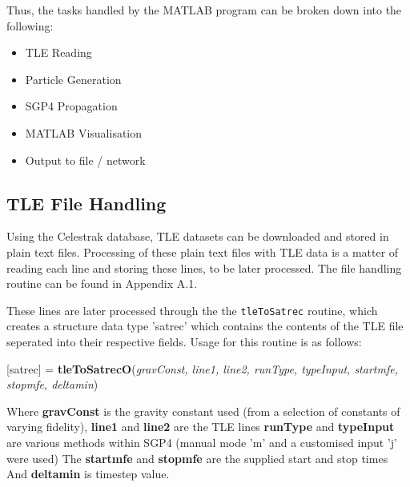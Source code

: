 \documentclass[12pt,openany,a4paper]{book}
\begin{document}
		
		Thus, the tasks handled by the MATLAB program can be broken down into the following:
		\begin{itemize}
			\item TLE Reading
			\item Particle Generation
			\item SGP4 Propagation
			\item MATLAB Visualisation
			\item Output to file / network
		\end{itemize}
		\subsection{TLE File Handling}
		Using the Celestrak database, TLE datasets can be downloaded and stored in plain text files. Processing of these plain text files with TLE data is a matter of reading each line and storing these lines, to be later processed. The file handling routine can be found in Appendix A.1. \newline
		
		
		These lines are later processed through the the \texttt{tleToSatrec} routine, which creates a structure data type 'satrec' which contains the contents of the TLE file seperated into their respective fields. Usage for this routine is as follows: \newline
		
		[satrec] = \textbf{tleToSatrecO}(\textit{gravConst, line1, line2, runType, typeInput, startmfe, stopmfe, deltamin}) \newline
	
		Where \textbf{gravConst} is the gravity constant used (from a selection of constants of varying fidelity), \newline 
		\textbf{line1} and \textbf{line2} are the TLE lines \newline
		\textbf{runType} and \textbf{typeInput} are various methods within SGP4 (manual mode 'm' and a customised input 'j' were used)\newline
		The \textbf{startmfe} and \textbf{stopmfe} are the supplied start and stop times \newline
		And \textbf{deltamin} is timestep value.
		
\end{document}
